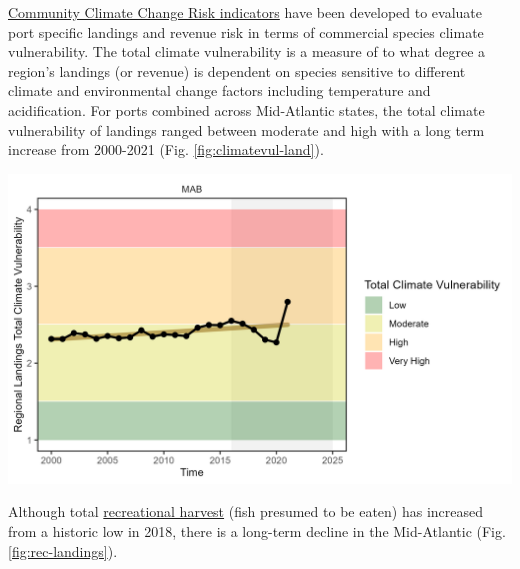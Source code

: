 \documentclass[
  10pt,
]{article}
\let\origfigure\figure
\let\endorigfigure\endfigure
\renewenvironment{figure}[1][2] {
    \expandafter\origfigure\expandafter[H]
} {
    \endorigfigure
}
\begin{document}
\href{https://noaa-edab.github.io/catalog/community_climate_vulnerability.html}{Community Climate Change Risk indicators} have been developed to evaluate port specific landings and revenue risk in terms of commercial species climate vulnerability. The total climate vulnerability is a measure of to what degree a region's landings (or revenue) is dependent on species sensitive to different climate and environmental change factors including temperature and acidification. For ports combined across Mid-Atlantic states, the total climate vulnerability of landings ranged between moderate and high with a long term increase from 2000-2021 (Fig. \ref{fig:climatevul-land}).

\begin{figure}

{\centering \includegraphics[width=6.5in]{images/MidAtlantic/climatevul_land_MidAtlantic_2025-09-05} 

}

\caption{Mid-Atlantic region total climate vulnerability of commercial landings (sum of Mid-Atlantic port landings weighted by species climate vulnerability from Hare et al. 2016).}\label{fig:climatevul-land}
\end{figure}

Although total \href{https://noaa-edab.github.io/catalog/recdat.html}{recreational harvest} (fish presumed to be eaten) has increased from a historic low in 2018, there is a long-term decline in the Mid-Atlantic (Fig. \ref{fig:rec-landings}).
\end{document}
